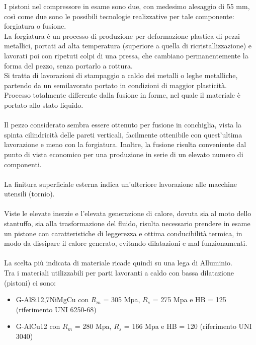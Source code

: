 I pistoni nel compressore in esame sono due, con medesimo alesaggio di 55 mm, così come due sono le possibili tecnologie realizzative per tale componente: forgiatura o fusione.\\
La forgiatura è un processo di produzione per deformazione plastica di pezzi metallici, portati ad alta temperatura (superiore a quella di ricristallizzazione) e lavorati poi con ripetuti colpi di una pressa, che cambiano permanentemente la forma del pezzo, senza portarlo a rottura.\\
Si tratta di lavorazioni di stampaggio a caldo dei metalli o leghe metalliche, partendo da un semilavorato portato in condizioni di maggior plasticità.\\
Processo totalmente differente dalla fusione in forme, nel quale il materiale è portato allo stato liquido.\\
\\
Il pezzo considerato sembra essere ottenuto per fusione in conchiglia, vista la spinta cilindricità delle pareti verticali, facilmente ottenibile con quest’ultima lavorazione e meno con la forgiatura. 
Inoltre, la fusione risulta conveniente dal punto di vista economico per una produzione in serie di un elevato numero di componenti.\\
\\
La finitura superficiale esterna indica un’ulteriore lavorazione alle macchine utensili (tornio).\\
\\
Viste le elevate inerzie e l’elevata generazione di calore, dovuta sia al moto dello stantuffo, sia alla trasformazione del fluido, risulta necessario prendere in esame un pistone con caratteristiche di leggerezza e ottima conducibilità termica, in modo da dissipare il calore generato, evitando dilatazioni e mal funzionamenti. \\
\\
La scelta più indicata di materiale ricade quindi su una lega di Alluminio. \\
Tra i materiali utilizzabili per parti lavoranti a caldo con bassa dilatazione (pistoni) ci sono: 
\begin{itemize}
    \item G-AlSi12,7NiMgCu con $R_m$ = 305 Mpa, $R_s$ = 275 Mpa e HB = 125 (riferimento UNI 6250-68)
    \item G-AlCu12 con $R_m$ = 280 Mpa, $R_s$ = 166 Mpa e HB = 120 (riferimento UNI 3040)
\end{itemize}
